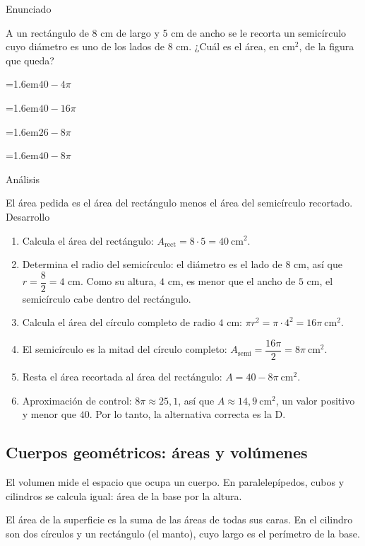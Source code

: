 \documentclass[10pt,a4paper,twocolumn]{article}
\newcommand{\alternativa}[2]{\par\noindent\hangindent=1.6em\hangafter=1\makebox[1.6em][l]{\tecla{#1}}#2\par}
\newcommand{\clave}[1]{\par\smallskip{\sffamily\footnotesize\color{esmeralda} Clave \teclaok{#1}}\par}
\begin{document}
\begin{ejemplo}
{\sffamily\footnotesize\color{zinc500} Enunciado}\par
A un rectángulo de 8 cm de largo y 5 cm de ancho se le recorta un semicírculo cuyo diámetro es uno de los lados de 8 cm. ¿Cuál es el área, en $\text{cm}^2$, de la figura que queda?
\alternativa{A}{$40 - 4\pi$}
\alternativa{B}{$40 - 16\pi$}
\alternativa{C}{$26 - 8\pi$}
\alternativa{D}{$40 - 8\pi$}
\clave{D}
{\sffamily\footnotesize\color{zinc500} Análisis}\par El área pedida es el área del rectángulo menos el área del semicírculo recortado.
{\sffamily\footnotesize\color{zinc500} Desarrollo}
\begin{enumerate}
  \item Calcula el área del rectángulo: $A_{\text{rect}} = 8\cdot 5 = 40\ \text{cm}^2$.
  \item Determina el radio del semicírculo: el diámetro es el lado de $8$ cm, así que $r = \dfrac{8}{2} = 4$ cm. Como su altura, $4$ cm, es menor que el ancho de $5$ cm, el semicírculo cabe dentro del rectángulo.
  \item Calcula el área del círculo completo de radio $4$ cm: $\pi r^2 = \pi\cdot 4^2 = 16\pi\ \text{cm}^2$.
  \item El semicírculo es la mitad del círculo completo: $A_{\text{semi}} = \dfrac{16\pi}{2} = 8\pi\ \text{cm}^2$.
  \item Resta el área recortada al área del rectángulo: $A = 40 - 8\pi\ \text{cm}^2$.
  \item Aproximación de control: $8\pi \approx 25{,}1$, así que $A \approx 14{,}9\ \text{cm}^2$, un valor positivo y menor que $40$. Por lo tanto, la alternativa correcta es la D.
\end{enumerate}
\end{ejemplo}

\subsection{Cuerpos geométricos: áreas y volúmenes}

El volumen mide el espacio que ocupa un cuerpo. En paralelepípedos, cubos y cilindros se calcula igual: área de la base por la altura.

El área de la superficie es la suma de las áreas de todas sus caras. En el cilindro son dos círculos y un rectángulo (el manto), cuyo largo es el perímetro de la base.
\end{document}
